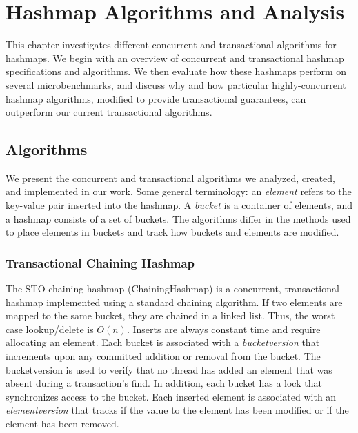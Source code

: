 \chapter{Hashmap Algorithms and Analysis}
\label{hashmap}

This chapter investigates different concurrent and transactional algorithms for hashmaps. We begin with an overview of concurrent and transactional hashmap specifications and algorithms. We then evaluate how these hashmaps perform on several microbenchmarks, and discuss why and how particular highly-concurrent hashmap algorithms, modified to provide transactional guarantees, can outperform our current transactional algorithms.

\section{Algorithms}

We present the concurrent and transactional algorithms we analyzed, created, and implemented in our work. Some general terminology: an \emph{element} refers to the key-value pair inserted into the hashmap. A \emph{bucket} is a container of elements, and a hashmap consists of a set of buckets. The algorithms differ in the methods used to place elements in buckets and track how buckets and elements are modified.

\subsection{Transactional Chaining Hashmap}
The STO chaining hashmap (ChainingHashmap) is a concurrent, transactional hashmap implemented using a standard chaining algorithm. If two elements are mapped to the same bucket, they are chained in a linked list. Thus, the worst case lookup/delete is $O(n)$. Inserts are always constant time and require allocating an element. Each bucket is associated with a \emph{bucketversion} that increments upon any committed addition or removal from the bucket. The bucketversion is used to verify that no thread has added an element that was absent during a transaction's find. In addition, each bucket has a lock that synchronizes access to the bucket. Each inserted element is associated with an \emph{elementversion} that tracks if the value to the element has been modified or if the element has been removed.

